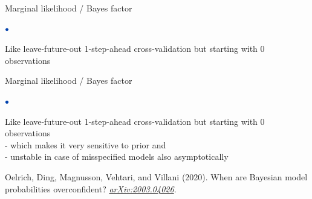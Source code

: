 \documentclass[english,t]{beamer}
\newenvironment{list1}{
   \begin{list}{$\color{list1}\bullet$}{\itemsep=6pt}}{
  \end{list}}
\begin{document}
\begin{frame}{Marginal likelihood / Bayes factor}

\vspace{-0.3\baselineskip}
\begin{list1}
\item Like leave-future-out 1-step-ahead cross-validation but starting with 0 observations\\
\end{list1}
\vspace{-0.5\baselineskip}

\end{frame}

\begin{frame}{Marginal likelihood / Bayes factor}

\vspace{-0.3\baselineskip}
\begin{list1}
\item Like leave-future-out 1-step-ahead cross-validation but starting with 0 observations\\
  {- which makes it very sensitive to prior}
  {and \\- unstable in case of misspecified
    models}{ also asymptotically}
\item Oelrich, Ding, Magnusson, Vehtari, and Villani (2020). When are Bayesian model probabilities overconfident? \textit{\href{https://arxiv.org/abs/2003.04026}{arXiv:2003.04026}}.
  
\end{list1}

\end{frame}
\end{document}
